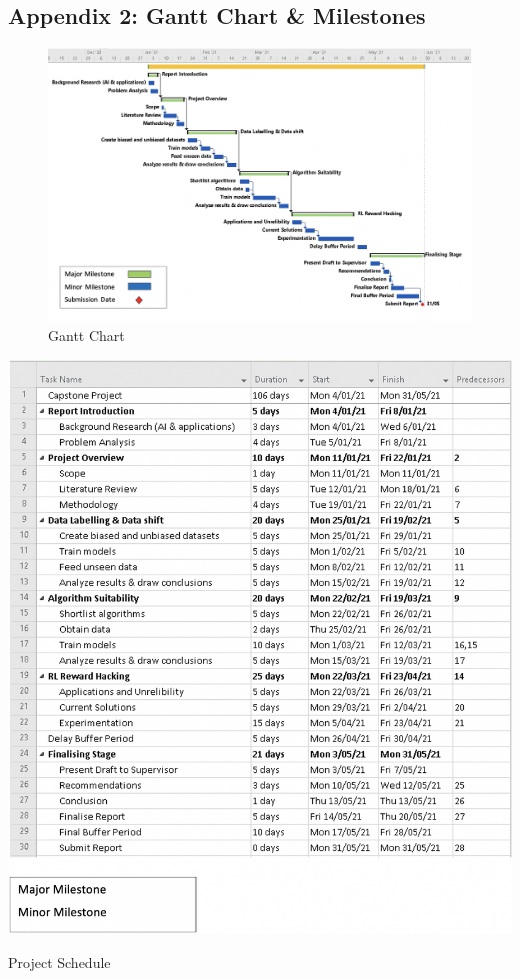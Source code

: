 \documentclass[a4paper,12pt]{report}
\begin{document}
\begin{landscape}
    \section{Appendix 2: Gantt Chart \& Milestones}
    \label{sec:app2}
    \begin{figure}[H]
        \centering
        \includegraphics[width=1.2\textwidth]{gantt chart.png}
        \caption{Gantt Chart}
        \label{fig:gantt}
    \end{figure}
\end{landscape}

\begin{table}[H]
    \centering
    \hspace*{-1.5cm}  
    \includegraphics[width=1.2\textwidth]{schedule.png}
    \caption{Project Schedule}
    \label{fig:schedule}
\end{table}
\restoregeometry
\end{document}
